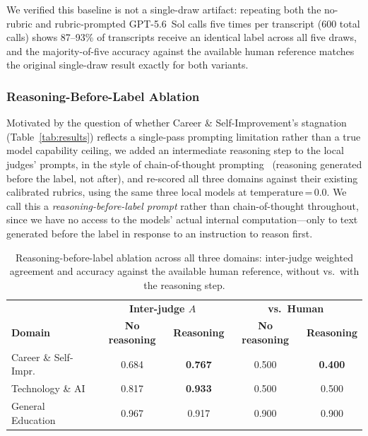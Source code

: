 \documentclass[11pt]{article}
\begin{document}
We verified this baseline is not a single-draw artifact: repeating both the
no-rubric and rubric-prompted GPT-5.6~Sol calls five times per transcript
(600 total calls) shows 87--93\% of transcripts receive an identical label
across all five draws, and the majority-of-five accuracy against the
available human reference matches the original single-draw result exactly
for both variants.

\subsubsection{Reasoning-Before-Label Ablation}
\label{sec:cotresults}

Motivated by the question of whether Career \&
Self-Improvement's stagnation (Table~\ref{tab:results}) reflects a
single-pass prompting limitation rather than a true model capability
ceiling, we added an intermediate reasoning step to the local judges'
prompts, in the style of chain-of-thought
prompting~\cite{wei2022chainofthought} (reasoning generated before the
label, not after), and re-scored all three domains against their existing
calibrated rubrics, using the same three local models at
temperature\,=\,0.0. We call this a \emph{reasoning-before-label prompt}
rather than chain-of-thought throughout, since we have no access to the
models' actual internal computation---only to text generated before the
label in response to an instruction to reason first.

\begin{table}[ht]
\centering
\caption{Reasoning-before-label ablation across all three domains:
inter-judge weighted agreement and accuracy against the available human
reference, without vs.\ with the reasoning step.}
\label{tab:cot}
\small
\begin{tabular}{lcccc}
\toprule
& \multicolumn{2}{c}{\textbf{Inter-judge $A$}} & \multicolumn{2}{c}{\textbf{vs.\ Human}} \\
\textbf{Domain} & \textbf{No reasoning} & \textbf{Reasoning} & \textbf{No reasoning} & \textbf{Reasoning} \\
\midrule
Career \& Self-Impr. & 0.684 & \textbf{0.767} & 0.500 & \textbf{0.400} \\
Technology \& AI     & 0.817 & \textbf{0.933} & 0.500 & 0.500 \\
General Education    & 0.967 & 0.917          & 0.900 & 0.900 \\
\bottomrule
\end{tabular}
\end{table}
\end{document}
